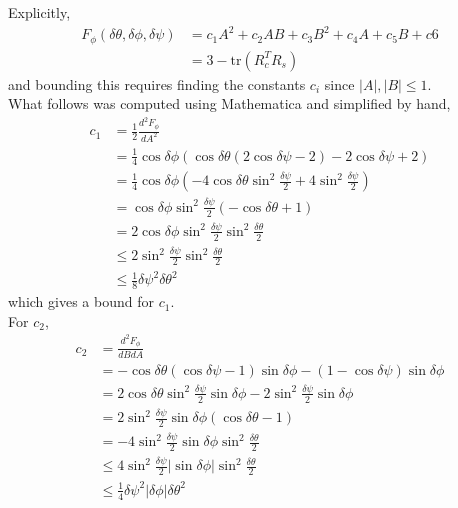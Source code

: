 \documentclass[12pt]{article}
\begin{document}
Explicitly, 
\begin{align}
F_\phi(\delta \theta, \delta \phi, \delta \psi) &= c_1 A^2 + c_2 AB + c_3 B^2 + c_4 A + c_5 B + c6\\
      &= 3   -  \text{tr}(R_c^TR_s)
\end{align}
and bounding this requires finding the constants $c_i$ since $|A|, |B| \leq 1$.\\

What follows was computed using Mathematica and simplified by hand,
\begin{align*}
c_1 &= \frac{1}{2} \frac{d^2F_\phi}{dA^2}\\
       &= \frac{1}{4} \cos \delta \phi  (\cos \delta \theta  (2 \cos \delta \psi -2)-2 \cos \delta \psi +2)\\
       &= \frac{1}{4} \cos \delta \phi  (-4 \cos \delta \theta \sin^2  \frac{\delta \psi}{2}+4 \sin^2 \frac{\delta \psi}{2})\\
       &=  \cos \delta \phi  \sin^2  \frac{\delta \psi}{2} (-\cos \delta \theta+ 1)\\
       &=  2\cos \delta \phi  \sin^2  \frac{\delta \psi}{2} \sin^2 \frac{\delta \theta}{2}\\
       &\leq  2  \sin^2  \frac{\delta \psi}{2} \sin^2 \frac{\delta \theta}{2}\\ 
       & \leq  \frac{1}{8} \delta \psi^2 \delta \theta^2
\end{align*}
which gives a bound for $c_1$.\\

For $c_2$,
\begin{align*}
c_2 &=  \frac{d^2F_\phi}{dBdA}\\
       &=-\cos \delta \theta  (\cos \delta \psi -1) \sin \delta \phi -(1-\cos \delta \psi) \sin \delta \phi\\
       &=2\cos \delta \theta\sin^2 \frac{\delta \psi}{2} \sin \delta \phi -2\sin^2 \frac{\delta \psi}{2} \sin \delta \phi\\
       &= 2\sin^2 \frac{\delta \psi}{2} \sin \delta \phi( \cos \delta \theta -1)\\
       &= -4\sin^2 \frac{\delta \psi}{2} \sin \delta \phi \sin^2 \frac{\delta \theta}{2}\\
       &\leq  4\sin^2 \frac{\delta \psi}{2} |\sin \delta \phi| \sin^2 \frac{\delta \theta}{2}\\
       & \leq \frac{1}{4}\delta \psi^2  |\delta \phi| \delta \theta^2
\end{align*}\\
\end{document}
